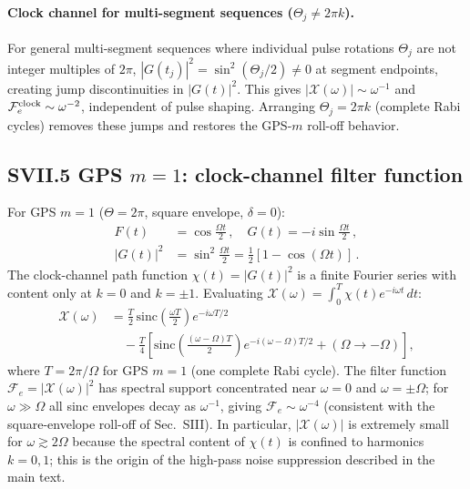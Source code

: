 \documentclass[aps,pra,twocolumn,superscriptaddress,longbibliography]{revtex4-2}
\begin{document}
       \paragraph{Clock channel for multi-segment sequences ($\Theta_j\neq 2\pi k$).}
       For general multi-segment sequences where individual pulse rotations $\Theta_j$
       are not integer multiples of $2\pi$, $|G(t_j)|^2=\sin^2(\Theta_j/2)\neq 0$
       at segment endpoints, creating jump discontinuities in $|G(t)|^2$.
       This gives $|\mathcal{X}(\omega)|\sim\omega^{-1}$
       and $\mathcal{F}_e^{\rm clock}\sim\omega^{-2}$, independent of pulse shaping.
       Arranging $\Theta_j=2\pi k$ (complete Rabi cycles) removes these jumps and
       restores the GPS-$m$ roll-off behavior.

       \subsection*{SVII.5 GPS $m=1$: clock-channel filter function}

       For GPS $m=1$ ($\Theta=2\pi$, square envelope, $\delta=0$):
       \begin{align}
         F(t) &= \cos\tfrac{\Omega t}{2}\,,\quad G(t) = -i\sin\tfrac{\Omega t}{2}\,, \\
         |G(t)|^2 &= \sin^2\!\tfrac{\Omega t}{2} = \tfrac{1}{2}[1-\cos(\Omega t)]\,.
       \end{align}
       The clock-channel path function $\chi(t)=|G(t)|^2$ is a finite Fourier series
       with content only at $k=0$ and $k=\pm 1$.
       Evaluating $\mathcal{X}(\omega)=\int_0^T\chi(t)e^{-i\omega t}\,dt$:
       \begin{align}
         \mathcal{X}(\omega) &= \frac{T}{2}\,\mathrm{sinc}\!\left(\frac{\omega T}{2}\right)
           e^{-i\omega T/2} \nonumber\\
           &\quad - \frac{T}{4}\!\left[\mathrm{sinc}\!\left(\frac{(\omega-\Omega)T}{2}\right)
             e^{-i(\omega-\Omega)T/2}
             + (\Omega\to{-\Omega})\right]\!,
         \label{eq:chi_GPS_sq}
       \end{align}
       where $T=2\pi/\Omega$ for GPS $m=1$ (one complete Rabi cycle).
       The filter function $\mathcal{F}_e=|\mathcal{X}(\omega)|^2$ has spectral support
       concentrated near $\omega=0$ and $\omega=\pm\Omega$; for $\omega\gg\Omega$ all
       sinc envelopes decay as $\omega^{-1}$, giving
       $\mathcal{F}_e\sim\omega^{-4}$ (consistent with the square-envelope roll-off of Sec.~SIII).
       In particular, $|\mathcal{X}(\omega)|$ is extremely small for $\omega\gtrsim 2\Omega$
       because the spectral content of $\chi(t)$ is confined to harmonics $k=0,1$;
       this is the origin of the high-pass noise suppression described in the main text.
\end{document}
